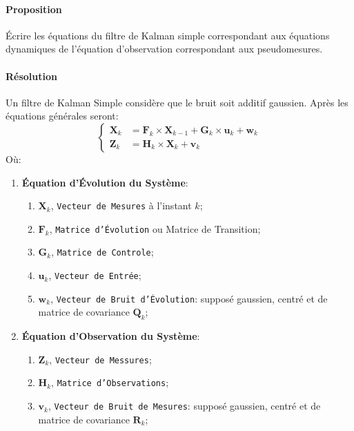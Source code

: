 \documentclass{article}
\begin{document}
\paragraph{Proposition}Écrire les équations du filtre de Kalman simple correspondant aux équations dynamiques de l'équation d'observation correspondant aux pseudomesures.

\paragraph{Résolution}Un filtre de Kalman Simple considère que le bruit soit additif gaussien. Après les équations générales seront:
\begin{equation*}
    \begin{cases}
        \mathbf{X}_{k} &= \mathbf{F}_{k} \times \mathbf{X}_{k-1} + \mathbf{G}_{k} \times \mathbf{u}_{k} + \mathbf{w}_{k}\\
        \mathbf{Z}_{k} &= \mathbf{H}_{k} \times \mathbf{X}_{k} + \mathbf{v}_{k}
    \end{cases}
\end{equation*}
Où:
\begin{enumerate}
    \item \textbf{Équation d'Évolution du Système}:
    \begin{enumerate}[noitemsep]
        \item $\mathbf{X}_{k}$, \texttt{Vecteur de Mesures} à l'instant $k$;
        \item $\mathbf{F}_{k}$, \texttt{Matrice d'Évolution} ou Matrice de Transition;
        \item $\mathbf{G}_{k}$, \texttt{Matrice de Controle};
        \item $\mathbf{u}_{k}$, \texttt{Vecteur de Entrée};
        \item $\mathbf{w}_{k}$, \texttt{Vecteur de Bruit d'Évolution}: supposé gaussien, centré et de matrice de covariance $\mathbf{Q}_{k}$;
    \end{enumerate}
    \item \textbf{Équation d'Observation du Système}:
    \begin{enumerate}[noitemsep]
        \item $\mathbf{Z}_{k}$, \texttt{Vecteur de Messures};
        \item $\mathbf{H}_{k}$, \texttt{Matrice d'Observations};
        \item $\mathbf{v}_{k}$, \texttt{Vecteur de Bruit de Mesures}: supposé gaussien, centré et de matrice de covariance $\mathbf{R}_{k}$;
    \end{enumerate}
\end{enumerate}
\end{document}

